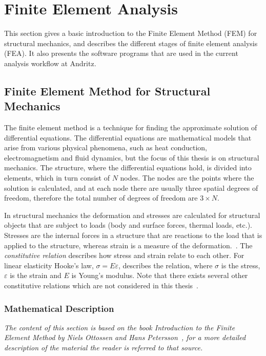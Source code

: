 
\chapter{Finite Element Analysis} %
\label{cha:finite_element_analysis}
This section gives a basic introduction to the Finite Element Method (FEM) for structural mechanics, and describes the different stages of finite element analysis (FEA). It also presents the software programs that are used in the current analysis workflow at Andritz.

\section{Finite Element Method for Structural Mechanics} %
\label{sec:finite_element_method_in_structural_mechanics}
The finite element method is a technique for finding the approximate solution of differential equations. The differential equations are mathematical models that arise from various physical phenomena, such as heat conduction, electromagnetism and fluid dynamics, but the focus of this thesis is on structural mechanics. The structure, where the differential equations hold, is divided into elements, which in turn consist of $N$ nodes. The nodes are the points where the solution is calculated, and at each node there are usually three spatial degrees of freedom, therefore the total number of degrees of freedom are $3\times N$.~\cite[p.~1--4]{ottossen92}

In structural mechanics the deformation and stresses are calculated for structural objects that are subject to loads (body and surface forces, thermal loads, etc.). Stresses are the internal forces in a structure that are reactions to the load that is applied to the structure, whereas strain is a measure of the deformation.~\cite[p.~235ff.]{ottossen92}. The \textit{constitutive relation} describes how stress and strain relate to each other. For linear elasticity Hooke's law, $\sigma=E\varepsilon$, describes the relation, where $\sigma$ is the stress, $\varepsilon$ is the strain and $E$ is Young's modulus. Note that there exists several other constitutive relations which are not considered in this thesis~\cite[p.~248]{ottossen92}.

\subsection{Mathematical Description} %
\label{sub:mathematical_description}
\textit{The content of this section is based on the book Introduction to the Finite Element Method by Niels Ottossen and Hans Petersson~\cite{ottossen92}, for a more detailed description of the material the reader is referred to that source.}

